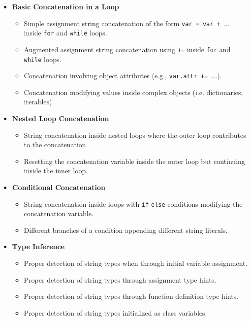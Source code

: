 \documentclass[12pt, titlepage]{article}
\begin{document}
\begin{itemize}
  \item \textbf{Basic Concatenation in a Loop}
  \begin{itemize}
      \item Simple assignment string concatenation of the form \texttt{var = var + \( \ldots \)} inside \texttt{for} and \texttt{while} loops.
      \item Augmented assignment string concatenation using \texttt{+=} inside \texttt{for} and \texttt{while} loops.
      \item Concatenation involving object attributes (e.g., \texttt{var.attr += \( \ldots \)}).
      \item Concatenation modifying values inside complex objects (i.e. dictionaries, iterables)
  \end{itemize}
  
  \item \textbf{Nested Loop Concatenation}
  \begin{itemize}
      \item String concatenation inside nested loops where the outer loop contributes to the concatenation.
      \item Resetting the concatenation variable inside the outer loop but continuing inside the inner loop.
  \end{itemize}

  \item \textbf{Conditional Concatenation}
  \begin{itemize}
      \item String concatenation inside loops with \texttt{if}-\texttt{else} conditions modifying the concatenation variable.
      \item Different branches of a condition appending different string literals.
  \end{itemize}

  \item \textbf{Type Inference}
  \begin{itemize}
      \item Proper detection of string types when through initial variable assignment.
      \item Proper detection of string types through assignment type hints.
      \item Proper detection of string types through function definition type hints.
      \item Proper detection of string types initialized as class variables.
  \end{itemize}


\end{itemize}
\end{document}
